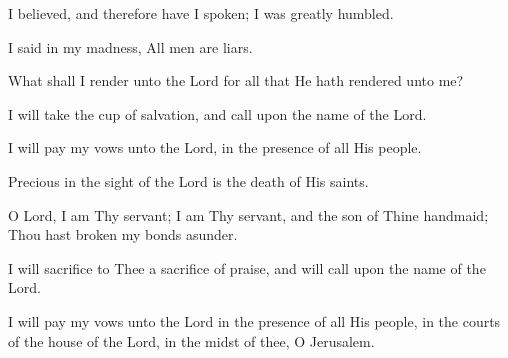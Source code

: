 I believed, and therefore have I spoken; I was greatly humbled.

I said in my madness, All men are liars.

What shall I render unto the Lord for all that He hath rendered unto me?

I will take the cup of salvation, and call upon the name of the Lord.

I will pay my vows unto the Lord, in the presence of all His people.

Precious in the sight of the Lord is the death of His saints.

O Lord, I am Thy servant; I am Thy servant, and the son of Thine handmaid; Thou hast broken my bonds asunder.

I will sacrifice to Thee a sacrifice of praise, and will call upon the name of the Lord.

I will pay my vows unto the Lord in the presence of all His people, in the courts of the house of the Lord, in the midst of thee, O Jerusalem.
